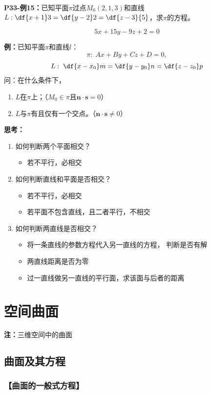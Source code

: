 {\bf P33-例15：}已知平面$\pi$过点$M_0(2,1,3)$和直线
$L:\df{x+1}3=\df{y-2}2=\df{z-3}{5}$，求$\pi$的方程。

$$5x+15y-9z+2=0$$

{\bf 例：}已知平面$\pi$和直线$l$：
$$\pi:\;Ax+By+Cz+D=0,$$
$$L:\;\df{x-x_0}m=\df{y-y_0}n=\df{z-z_0}p$$
问：在什么条件下，
\begin{enumerate}[(1)]
  \setlength{\itemindent}{1cm}
  \item $L$在$\pi$上；\hfill（$M_0\in\pi$且$\bm{n}\cdot\bm{s}=0$）
  \item $L$与$\pi$有且仅有一个交点。\hfill（$\bm{n}\cdot\bm{s}\ne0$）
\end{enumerate}

{\bf 思考：}

\begin{enumerate}[(1)]
  \setlength{\itemindent}{1cm}
  \item 如何判断两个平面相交？
  \begin{itemize}
    \item 若不平行，必相交
  \end{itemize}
  \item 如何判断直线和平面是否相交？
  \begin{itemize}
    \item 若不平行，必相交
    \item 若平面不包含直线，且二者平行，不相交
  \end{itemize}
  \item 如何判断两直线是否相交？
  \begin{itemize}
    \item 将一条直线的参数方程代入另一直线的方程，
    判断是否有解
    \item 两直线距离是否为零
    \item 过一直线做另一直线的平行面，求该面与后者的距离
  \end{itemize}
\end{enumerate}

\section{空间曲面}

{\bf 注：}三维空间中的曲面

\subsection{曲面及其方程}

\subsubsection{【曲面的一般式方程】}

